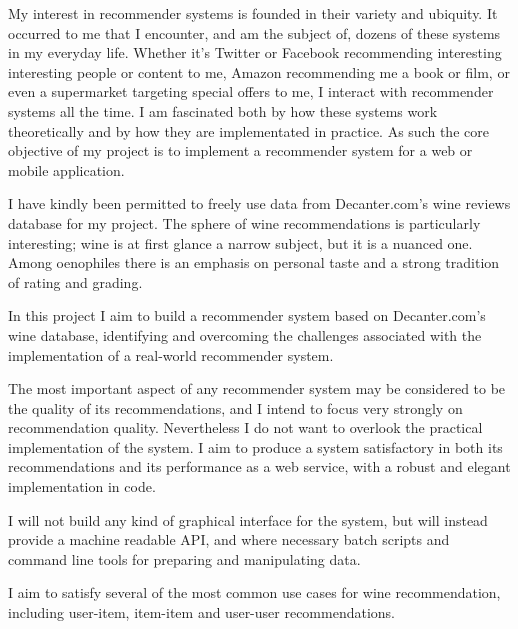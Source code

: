 My interest in recommender systems is founded in their variety and ubiquity. It occurred to me that I encounter, and am the subject of, dozens of these systems in my everyday life. Whether it's Twitter or Facebook recommending interesting interesting people or content to me, Amazon recommending me a book or film, or even a supermarket targeting special offers to me, I interact with recommender systems all the time. I am fascinated both by how these systems work theoretically and by how they are implementated in practice. As such the core objective of my project is to implement a recommender system for a web or mobile application.

I have kindly been permitted to freely use data from Decanter.com's wine reviews database \cite{DecanterWine} for my project. The sphere of wine recommendations is particularly interesting; wine is at first glance a narrow subject, but it is a nuanced one. Among oenophiles there is an emphasis on personal taste and a strong tradition of rating and grading. 

In this project I aim to build a recommender system based on Decanter.com's wine database, identifying and overcoming the challenges associated with the implementation of a real-world recommender system.

The most important aspect of any recommender system may be considered to be the quality of its recommendations, and I intend to focus very strongly on recommendation quality. Nevertheless I do not want to overlook the practical implementation of the system. I aim to produce a system satisfactory in both its recommendations and its performance as a web service, with a robust and elegant implementation in code. 

I will not build any kind of graphical interface for the system, but will instead provide a machine readable API, and where necessary batch scripts and command line tools for preparing and manipulating data.

I aim to satisfy several of the most common use cases for wine recommendation, including user-item, item-item and user-user recommendations.

